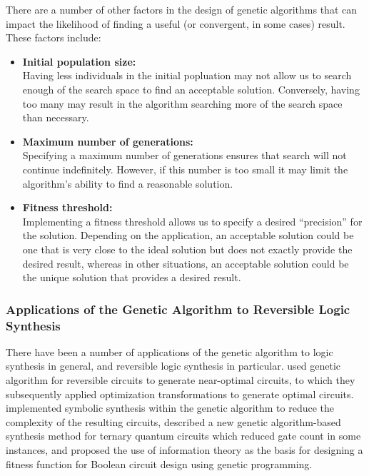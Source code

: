 There are a number of other factors in the design of genetic algorithms that can impact the likelihood of finding a useful (or convergent, in some cases) result. 
These factors include:
\begin{itemize}
 \item {\bf Initial population size:}
\\ Having less individuals in the initial popluation may not allow us to search enough of the search space to find an acceptable solution. Conversely, having too many may result in the algorithm searching more of the search space than necessary.
 \item {\bf Maximum number of generations:}
\\ Specifying a maximum number of generations ensures that search will not continue indefinitely. However, if this number is too small it may limit the algorithm's ability to find a reasonable solution.
 \item {\bf Fitness threshold:}
\\Implementing a fitness threshold allows us to specify a desired ``precision'' for the solution. Depending on the application, an acceptable solution could be one that is very close to the ideal solution but does not exactly provide the
desired result, whereas in other situations, an acceptable solution could be the unique solution that provides a desired result. 
\end{itemize}
 

\subsubsection{Applications of the Genetic Algorithm to Reversible Logic Synthesis}

There have been a number of applications of the genetic algorithm to logic synthesis in general, and reversible logic synthesis in 
particular. \cite{Lukac2003} used genetic algorithm for reversible circuits to generate near-optimal circuits, to which they subsequently applied 
optimization transformations to generate optimal circuits. \cite{Lukac2008} implemented symbolic synthesis within the genetic algorithm to reduce the complexity of the resulting circuits, 
\cite{Khan2004} described a new genetic algorithm-based synthesis method for ternary quantum circuits which reduced gate count in some instances, and 
\cite{Aguirre2003} proposed the use of information theory as the basis for designing a fitness function for Boolean circuit design using genetic programming.